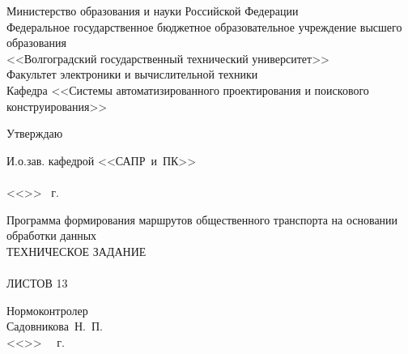 \thispagestyle{empty}
\begin{center}
    Министерство образования и науки Российской Федерации \\
    Федеральное государственное бюджетное образовательное учреждение высшего образования\\
    <<Волгоградский государственный технический университет>>\\
    Факультет электроники и вычислительной техники\\
    Кафедра <<Системы автоматизированного проектирования и поискового конструирования>>
    \vspace{1em}
\end{center}
\begin{flushright}
    \begin{center}
        \hspace*{9.7em}Утверждаю
    \end{center}
    И.о.зав. кафедрой <<САПР~и~ПК>>\\
    \hspace{0.5em}\\
    \vspace{0.5em}<<\underline{\hspace{2.5em}}>> \underline{\hspace{8.5em}} \the\year\ г.
\end{flushright}
\vspace{1em}
\begin{center}
    Программа формирования маршрутов общественного транспорта на основании обработки данных\\
    ТЕХНИЧЕСКОЕ ЗАДАНИЕ\\
    \vspace{2em}
    \MASTERWORK\\
    ЛИСТОВ 13
\end{center}
\vspace{3em}
\begin{minipage}[t]{0.6\textwidth}
    \vspace{4em}
    \begin{flushleft}
        Нормоконтролер\\
        Садовникова~Н.~П.\\
        <<\LINE{1.5em}>>\ \LINE{7em} \the\year\ г.
    \end{flushleft}
\end{minipage}
